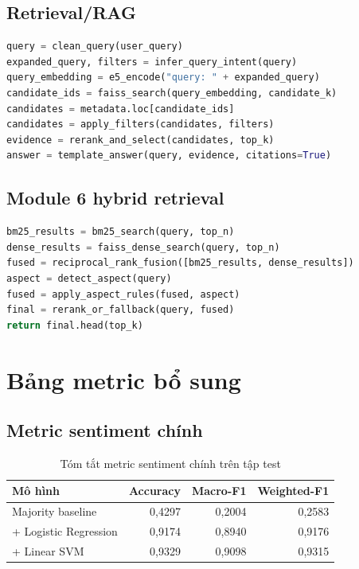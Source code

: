 \section{Retrieval/RAG}
\begin{keepcode}
\begin{lstlisting}[language=Python]
query = clean_query(user_query)
expanded_query, filters = infer_query_intent(query)
query_embedding = e5_encode("query: " + expanded_query)
candidate_ids = faiss_search(query_embedding, candidate_k)
candidates = metadata.loc[candidate_ids]
candidates = apply_filters(candidates, filters)
evidence = rerank_and_select(candidates, top_k)
answer = template_answer(query, evidence, citations=True)
\end{lstlisting}
\end{keepcode}

\section{Module 6 hybrid retrieval}
\begin{keepcode}
\begin{lstlisting}[language=Python]
bm25_results = bm25_search(query, top_n)
dense_results = faiss_dense_search(query, top_n)
fused = reciprocal_rank_fusion([bm25_results, dense_results])
aspect = detect_aspect(query)
fused = apply_aspect_rules(fused, aspect)
final = rerank_or_fallback(query, fused)
return final.head(top_k)
\end{lstlisting}
\end{keepcode}

\chapter{Bảng metric bổ sung}

\section{Metric sentiment chính}
\begin{table}[H]
\centering
\caption{Tóm tắt metric sentiment chính trên tập test}
\label{tab:appendix-sentiment-metrics}
\begin{tabular}{lrrr}
\toprule
Mô hình & Accuracy & Macro-F1 & Weighted-F1 \\
\midrule
Majority baseline & 0,4297 & 0,2004 & 0,2583 \\
\TFIDF{} + Logistic Regression & 0,9174 & 0,8940 & 0,9176 \\
\TFIDF{} + Linear SVM & 0,9329 & 0,9098 & 0,9315 \\
\bottomrule
\end{tabular}
\end{table}


